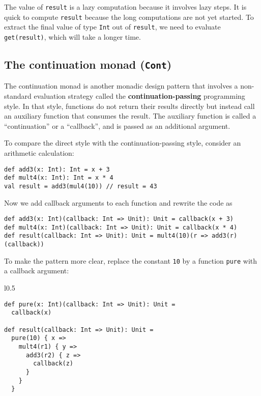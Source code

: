 \noindent The value of \lstinline!result! is a lazy computation because
it involves lazy steps. It is quick to compute \lstinline!result!
because the long computations are not yet started. To extract the
final value of type \lstinline!Int! out of \lstinline!result!, we
need to evaluate \lstinline!get(result)!, which will take a longer
time.

\subsection{The continuation monad (\texttt{Cont})\label{subsec:The-continuation-monad}}

The
continuation monad is another monadic design pattern that involves
a non-standard evaluation strategy called the \textbf{continuation-passing}
programming style. In that style,
functions do not return their results directly but instead call an
auxiliary function that consumes the result. The auxiliary function
is called a \textsf{``}continuation\textsf{''} or a \textsf{``}callback\textsf{''},
and is passed as an additional argument.

To compare the direct style with the continuation-passing style, consider
an arithmetic calculation:
\begin{lstlisting}
def add3(x: Int): Int = x + 3
def mult4(x: Int): Int = x * 4
val result = add3(mul4(10)) // result = 43
\end{lstlisting}
Now we add callback arguments to each function and rewrite the code
as
\begin{lstlisting}
def add3(x: Int)(callback: Int => Unit): Unit = callback(x + 3)
def mult4(x: Int)(callback: Int => Unit): Unit = callback(x * 4)
def result(callback: Int => Unit): Unit = mult4(10)(r => add3(r)(callback))
\end{lstlisting}
To make the pattern more clear, replace the constant \lstinline!10!
by a function \lstinline!pure! with a callback argument:

\begin{wrapfigure}{l}{0.5\columnwidth}%
\vspace{-0.8\baselineskip}
\begin{lstlisting}
def pure(x: Int)(callback: Int => Unit): Unit =
  callback(x)

def result(callback: Int => Unit): Unit =
  pure(10) { x =>
    mult4(r1) { y =>
      add3(r2) { z =>
        callback(z)
      }
    }
  }
\end{lstlisting}

\vspace{-1\baselineskip}
\end{wrapfigure}%

